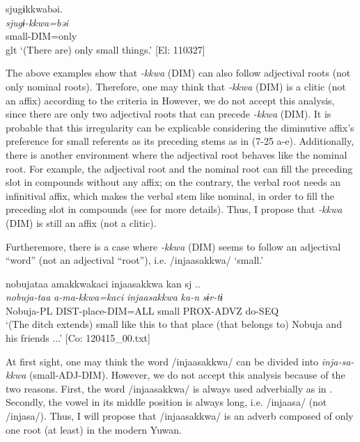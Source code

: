 \ex \label{ex:7:b}%
\glll  sjugɨkkwabəi.\\
\textit{sjugɨ-kkwa=bəi}\\
small-DIM=only\\
glt ‘(There are) only small things.’ [El: 110327]
\z
\z

The above examples show that \textit{{}-kkwa} (DIM) can also follow adjectival roots (not only nominal roots). Therefore, one may think that \textit{{}-kkwa} (DIM) is a clitic (not an affix) according to the criteria in  However, we do not accept this analysis, since there are only two adjectival roots that can precede \textit{-kkwa} (DIM). It is probable that this irregularity can be explicable considering the diminutive affix’s preference for small referents as its preceding stems as in (7-25 a-e). Additionally, there is another environment where the adjectival root behaves like the nominal root. For example, the adjectival root and the nominal root can fill the preceding slot in compounds without any affix; on the contrary, the verbal root needs an infinitival affix, which makes the verbal stem like nominal, in order to fill the preceding slot in compounds (see  for more details). Thus, I propose that \textit{{}-kkwa} (DIM) is still an affix (not a clitic).

Furtheremore, there is a case where \textit{{}-kkwa} (DIM) seems to follow an adjectival “word” (not an adjectival “root”), i.e. /injaasakkwa/ ‘small.’

\ea \label{ex:7:30}  %
\glll  nobujataa  amakkwakaci  injaasakkwa  kan  sj ..\\
\textit{nobuja-taa}  \textit{a-ma-kkwa=kaci}  \textit{injaasakkwa}  \textit{ka-n}  \textit{sɨr-tɨ}\\
Nobuja-PL  DIST-place-DIM=ALL  small  PROX-ADVZ  do-SEQ\\
\glt ‘(The ditch extends) small like this to that place (that belongs to) Nobuja and his friends ...’ [Co: 120415\_00.txt]
\z

At first sight, one may think the word /injaasakkwa/ can be divided into \textit{inja-sa-kkwa} (small-ADJ-DIM). However, we do not accept this analysis because of the two reasons. First, the word /injaasakkwa/ is always used adverbially as in . Secondly, the vowel in its middle position is always long, i.e. /injaasa/ (not /injasa/). Thus, I will propose that /injaasakkwa/ is an adverb composed of only one root (at least) in the modern Yuwan.
